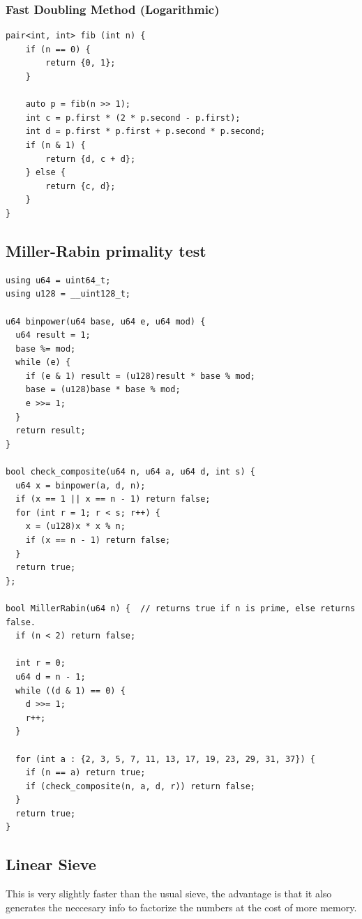 \documentclass[10pt]{article}
\begin{document}
\subsubsection{Fast Doubling Method (Logarithmic)}

\begin{lstlisting}
pair<int, int> fib (int n) {
    if (n == 0) {
        return {0, 1};
    }

    auto p = fib(n >> 1);
    int c = p.first * (2 * p.second - p.first);
    int d = p.first * p.first + p.second * p.second;
    if (n & 1) {
        return {d, c + d};
    } else {
        return {c, d};
    }
}
\end{lstlisting}

\subsection{Miller-Rabin primality test}

\begin{lstlisting}
using u64 = uint64_t;
using u128 = __uint128_t;

u64 binpower(u64 base, u64 e, u64 mod) {
  u64 result = 1;
  base %= mod;
  while (e) {
    if (e & 1) result = (u128)result * base % mod;
    base = (u128)base * base % mod;
    e >>= 1;
  }
  return result;
}

bool check_composite(u64 n, u64 a, u64 d, int s) {
  u64 x = binpower(a, d, n);
  if (x == 1 || x == n - 1) return false;
  for (int r = 1; r < s; r++) {
    x = (u128)x * x % n;
    if (x == n - 1) return false;
  }
  return true;
};

bool MillerRabin(u64 n) {  // returns true if n is prime, else returns false.
  if (n < 2) return false;

  int r = 0;
  u64 d = n - 1;
  while ((d & 1) == 0) {
    d >>= 1;
    r++;
  }

  for (int a : {2, 3, 5, 7, 11, 13, 17, 19, 23, 29, 31, 37}) {
    if (n == a) return true;
    if (check_composite(n, a, d, r)) return false;
  }
  return true;
}
\end{lstlisting}

\subsection{Linear Sieve}

This is very slightly faster than the usual sieve, the advantage is that it
also generates the neccesary info to factorize the numbers at the cost of more
memory.
\end{document}
